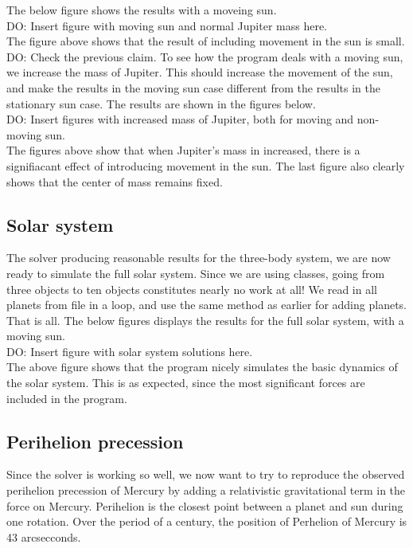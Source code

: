 \documentclass{article}
\begin{document}
The below figure shows the results with a moveing sun.\\

DO: Insert figure with moving sun and normal Jupiter mass here.\\

The figure above shows that the result of including movement in the sun is small. DO: Check the previous claim. To see how the program deals with a moving sun, we increase the mass of Jupiter. This should increase the movement of the sun, and make the results in the moving sun case different from the results in the stationary sun case. The results are shown in the figures below.\\

DO: Insert figures with increased mass of Jupiter, both for moving and non-moving sun.\\

The figures above show that when Jupiter's mass in increased, there is a signifiacant effect of introducing movement in the sun. The last figure also clearly shows that the center of mass remains fixed.


\subsection{Solar system}
The solver producing reasonable results for the three-body system, we are now ready to simulate the full solar system. Since we are using classes, going from three objects to ten objects constitutes nearly no work at all! We read in all planets from file in a loop, and use the same method as earlier for adding planets. That is all. The below figures displays the results for the full solar system, with a moving sun. \\

DO: Insert figure with solar system solutions here.\\

The above figure shows that the program nicely simulates the basic dynamics of the solar system. This is as expected, since the most significant forces are included in the program. 

\subsection{Perihelion precession}
Since the solver is working so well, we now want to try to reproduce the observed perihelion precession of Mercury by adding a relativistic gravitational term in the force on Mercury. Perihelion is the closest point between a planet and sun during one rotation. Over the period of a century, the position of Perhelion of Mercury is 43 arcsecconds. \\
\end{document}

